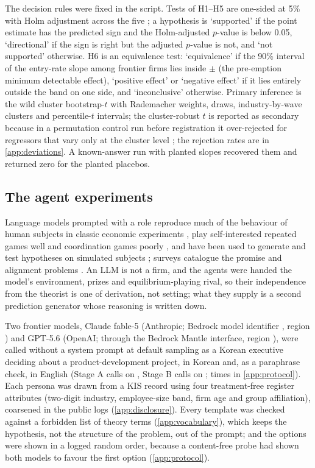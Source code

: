 \documentclass[preprint,12pt,authoryear]{elsarticle}
\begin{document}
The decision rules were fixed in the script. Tests of H1--H5 are one-sided at 5\% with Holm adjustment across the five \citep{holm1979simple}; a hypothesis is `supported' if the point estimate has the predicted sign and the Holm-adjusted $p$-value is below 0.05, `directional' if the sign is right but the adjusted $p$-value is not, and `not supported' otherwise. H6 is an equivalence test: `equivalence' if the 90\% interval of the entry-rate slope among frontier firms lies inside $\pm$\KISHSixDelta{} (the pre-emption minimum detectable effect), `positive effect' or `negative effect' if it lies entirely outside the band on one side, and `inconclusive' otherwise. Primary inference is the wild cluster bootstrap-$t$ with Rademacher weights, \NBoot{} draws, industry-by-wave clusters and percentile-$t$ intervals; the cluster-robust $t$ is reported as secondary because in a permutation control run before registration it over-rejected for regressors that vary only at the cluster level \citep{cameron2008bootstrap}; the rejection rates are in \ref{app:deviations}. A known-answer run with planted slopes recovered them and returned zero for the planted placebos.

\subsection{The agent experiments}
\label{sec:agents}

Language models prompted with a role reproduce much of the behaviour of human subjects in classic economic experiments \citep{horton2023large,chen2023emergence,argyle2023out}, play self-interested repeated games well and coordination games poorly \citep{akata2025playing}, and have been used to generate and test hypotheses on simulated subjects \citep{manning2024automated}; surveys catalogue the promise and alignment problems \citep{gao2024large,park2023generative}. An LLM is not a firm, and the agents were handed the model's environment, prizes and equilibrium-playing rival, so their independence from the theorist is one of derivation, not setting; what they supply is a second prediction generator whose reasoning is written down.

Two frontier models, Claude fable-5 (Anthropic; Bedrock model identifier \ModelIdFable, region \ModelRegionFable) and GPT-5.6 (OpenAI; \ModelIdGpt{} through the Bedrock Mantle interface, region \ModelRegionGpt), were called without a system prompt at default sampling as a Korean executive deciding about a product-development project, in Korean and, as a paraphrase check, in English (Stage A calls on \StageACallsDate{}, Stage B calls on \StageBCallsDate{}; times in \ref{app:protocol}). Each persona was drawn from a KIS record using four treatment-free register attributes (two-digit industry, employee-size band, firm age and group affiliation), coarsened in the public logs (\ref{app:disclosure}). Every template was checked against a forbidden list of theory terms (\ref{app:vocabulary}), which keeps the hypothesis, not the structure of the problem, out of the prompt; and the options were shown in a logged random order, because a content-free probe had shown both models to favour the first option (\ref{app:protocol}).
\end{document}
